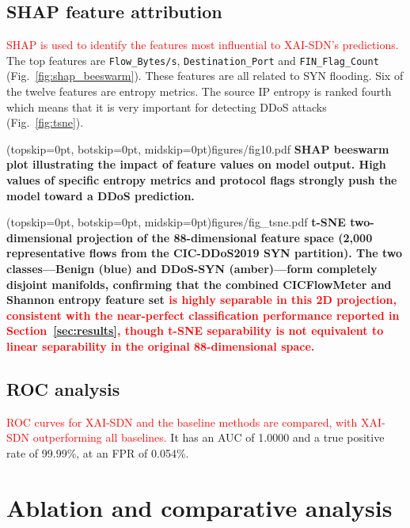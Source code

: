 \documentclass{ieeeaccess}
\begin{document}
\subsection{SHAP feature attribution}
\textcolor{red}{SHAP is used to identify the features most influential to XAI-SDN's predictions.} The top features are \texttt{Flow\_Bytes/s}, \texttt{Destination\_Port} and \texttt{FIN\_Flag\_Count} (Fig.~\ref{fig:shap_beeswarm}). These features are all related to SYN flooding. Six of the twelve features are entropy metrics. The source IP entropy is ranked fourth which means that it is very important for detecting DDoS attacks (Fig.~\ref{fig:tsne}).

\Figure[t!](topskip=0pt, botskip=0pt, midskip=0pt){figures/fig10.pdf}
{ \textbf{SHAP beeswarm plot illustrating the impact of feature values on model output. High values of specific entropy metrics and protocol flags strongly push the model toward a DDoS prediction.}\label{fig:shap_beeswarm}}

\Figure[t!](topskip=0pt, botskip=0pt, midskip=0pt){figures/fig_tsne.pdf}
{ \textbf{t-SNE two-dimensional projection of the 88-dimensional feature space (2,000 representative flows from the CIC-DDoS2019 SYN partition). The two classes---Benign (blue) and DDoS-SYN (amber)---form completely disjoint manifolds, confirming that the combined CICFlowMeter and Shannon entropy feature set \textcolor{red}{is highly separable in this 2D projection, consistent with the near-perfect classification performance reported in Section~\ref{sec:results}, though t-SNE separability is not equivalent to linear separability in the original 88-dimensional space.}}\label{fig:tsne}}

\subsection{ROC analysis}
\textcolor{red}{ROC curves for XAI-SDN and the baseline methods are compared, with XAI-SDN outperforming all baselines.} It has an AUC of 1.0000 and a true positive rate of 99.99\%, at an FPR of 0.054\%.

\section{Ablation and comparative analysis}
\label{sec:comparative}
\end{document}
